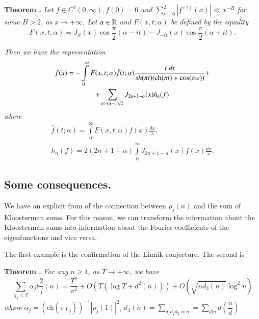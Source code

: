\medskip
\noindent
{\bfseries Theorem .\label{art7-thm5}}%
\textit{Let $f\in C^2 (0, \infty), f (0) = 0$ and $\sum\limits^2_{r=0} |f^{(t)} (x)| \ll x^{-B}$ for some $B>2$, as $x \to + \infty$. Let $\alpha \in \mathbb{R}$ and $F(x,t;\alpha)$ be defined by the equality} 
\begin{equation}
F(x, t; \alpha) = J_{it} (x) \cos \frac{\pi}{2} (\alpha - it) - J_{-it}  (x) \cos \frac{\pi}{2} (\alpha + it) . \label{art7-eq1.38}
\end{equation}

\textit{Then we have the representation}
\begin{gather}
f(x) = - \int\limits^\infty_0 F(x, t; \alpha) \hat{f} (t;\alpha) \frac{t \; dt}{ sh (\pi t) (\text{ch}(\pi t) + \cos (\pi \alpha))} +\label{art7-eq1.39}\\
+ \sum\limits_{n>(\alpha -1) /2} J_{2n + 1-\alpha} (x) h_n (f) \notag
\end{gather}
\textit{where}\pageoriginale 
\begin{gather}
\hat{f} (t;\alpha) = \int\limits^\infty_0 F(x, t; \alpha) f(x) \frac{dx}{x}, \label{art7-eq1.40}\\
h_n(f) = 2 (2n+1-\alpha) \int\limits^\infty_0 J_{2n +1 -\alpha}  (x) f (x) \frac{dx}{x} .
\label{art7-eq1.41}
\end{gather}

\subsection{Some consequences.}\label{art7-subsec1.7}
We have an explicit from of the connection between $\rho_j(n)$ and the sum of Kloosterman sums. For this reason, we can transform the information about the Kloosterman sums into information about the Fourier coefficients of the eigenfunctions and vice versa.

The first example is the confirmation of the Linnik conjecture. The second is 

\noindent
{\bfseries Theorem .\label{art7-thm6}} \textit{For any $n\geqslant 1$, as $T \to + \infty$, we have}
\begin{equation}
\sum\limits_{\chi_j \leqslant T} \alpha_j t \frac{2}{j} (n) = \frac{T^2}{\pi^2} + O(T (\log T + d^2 (n))) + O(\sqrt{nd_3 (n)} \log^2 n)  \label{art7-eq1.42}
\end{equation}
\textit{where} $\alpha_j = (\text{ch}(\pi \chi_j))^{-1} |\rho_j(1)|^2$, $d_3 (n) = \sum\limits_{d_1 d_2 d_3 = n} = \sum\limits_{d|n} d \left(\dfrac{n}{d} \right)$

